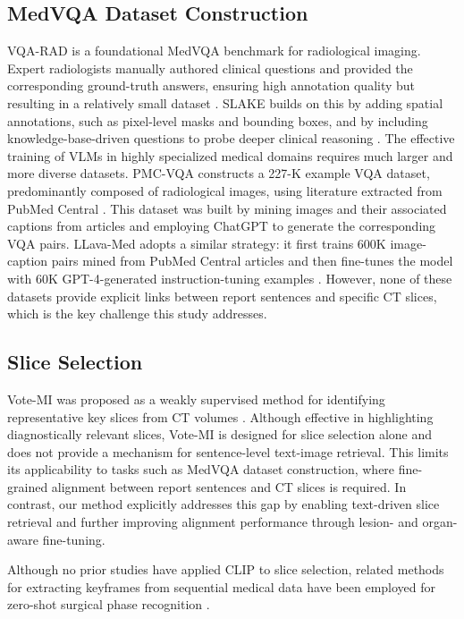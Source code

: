 \documentclass[bioengineering,article,submit,pdftex,moreauthors]{Definitions/mdpi}
\begin{document}
\subsection{MedVQA Dataset Construction}
VQA-RAD is a foundational MedVQA benchmark for radiological imaging. 
Expert radiologists manually authored clinical questions and provided the corresponding ground-truth answers, ensuring high annotation quality but resulting in a relatively small dataset \cite{lau_dataset_2018}. 
SLAKE builds on this by adding spatial annotations, such as pixel-level masks and bounding boxes, and by including knowledge-base-driven questions to probe deeper clinical reasoning \cite{liu_slake_2021}.
The effective training of VLMs in highly specialized medical domains requires much larger and more diverse datasets. 
PMC-VQA constructs a 227-K example VQA dataset, predominantly composed of radiological images, using literature extracted from PubMed Central \cite{zhang_pmc-vqa_2024}.
This dataset was built by mining images and their associated captions from articles and employing ChatGPT to generate the corresponding VQA pairs.
LLava-Med adopts a similar strategy: it first trains 600K image-caption pairs mined from PubMed Central articles and then fine-tunes the model with 60K GPT-4-generated instruction-tuning examples \cite{li_llava-med_2023}.
However, none of these datasets provide explicit links between report sentences and specific CT slices, which is the key challenge this study addresses.

\subsection{Slice Selection}
Vote-MI was proposed as a weakly supervised method for identifying representative key slices from CT volumes \cite{wang_enhancing_2024}. Although effective in highlighting diagnostically relevant slices, Vote-MI is designed for slice selection alone and does not provide a mechanism for sentence-level text-image retrieval. This limits its applicability to tasks such as MedVQA dataset construction, where fine-grained alignment between report sentences and CT slices is required. In contrast, our method explicitly addresses this gap by enabling text-driven slice retrieval and further improving alignment performance through lesion- and organ-aware fine-tuning.

Although no prior studies have applied CLIP to slice selection, related methods for extracting keyframes from sequential medical data have been employed for zero-shot surgical phase recognition \cite{yuan_hecvl_2025}.
\end{document}
